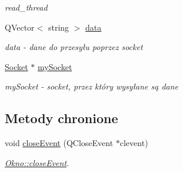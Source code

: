 \begin{DoxyCompactItemize}
\begin{DoxyCompactList}\small\item\em read\-\_\-thread \end{DoxyCompactList}\item 
\hypertarget{class_okno_af210b4fcf0872b832f3cc49bace1c48d}{Q\-Vector$<$ string $>$ \hyperlink{class_okno_af210b4fcf0872b832f3cc49bace1c48d}{data}}\label{class_okno_af210b4fcf0872b832f3cc49bace1c48d}

\begin{DoxyCompactList}\small\item\em data -\/ dane do przesyłu poprzez socket \end{DoxyCompactList}\item 
\hypertarget{class_okno_a58a686222d1cc92f47d454c2481ce8d8}{\hyperlink{class_socket}{Socket} $\ast$ \hyperlink{class_okno_a58a686222d1cc92f47d454c2481ce8d8}{my\-Socket}}\label{class_okno_a58a686222d1cc92f47d454c2481ce8d8}

\begin{DoxyCompactList}\small\item\em my\-Socket -\/ socket, przez który wysyłane są dane \end{DoxyCompactList}\end{DoxyCompactItemize}
\subsection*{Metody chronione}
\begin{DoxyCompactItemize}
\item 
void \hyperlink{class_okno_aecd3efa2e5687dad240bf830c73984ba}{close\-Event} (Q\-Close\-Event $\ast$clevent)
\begin{DoxyCompactList}\small\item\em \hyperlink{class_okno_aecd3efa2e5687dad240bf830c73984ba}{Okno\-::close\-Event}. \end{DoxyCompactList}\end{DoxyCompactItemize}
